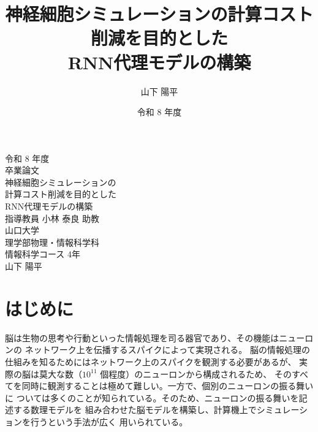 \documentclass[a4paper,11pt,openany]{ltjsreport}
\title{神経細胞シミュレーションの計算コスト削減を目的とした\\RNN代理モデルの構築}
\author{山下 陽平}
\date{令和 8 年度}
\newcommand{\TODO}[1]{\textcolor{red}{\textbf{[TODO: #1]}}}
\begin{document}
\begin{titlepage}
  \centering
  \vspace*{20mm}
  {\Large 令和 8 年度}\\[15mm]
  {\LARGE 卒業論文}\\[25mm]
  {\LARGE 神経細胞シミュレーションの}\\[3mm]
  {\LARGE 計算コスト削減を目的とした}\\[3mm]
  {\LARGE RNN代理モデルの構築}\\[32mm]
  {\large 指導教員 小林 泰良 助教}\\[20mm]
  {\large 山口大学}\\[3mm]
  {\large 理学部\quad 物理・情報科学科}\\[3mm]
  {\large 情報科学コース 4年}\\[20mm]
  {\large 山下 陽平}
  \vfill
\end{titlepage}

\tableofcontents
\clearpage

\chapter{はじめに}

脳は生物の思考や行動といった情報処理を司る器官であり、その機能はニューロンの
ネットワーク上を伝播するスパイクによって実現される\cite{yamazaki2021}。
脳の情報処理の仕組みを知るためにはネットワーク上のスパイクを観測する必要があるが、
実際の脳は莫大な数（$10^{11}$ 個程度\cite{kandel2022}）のニューロンから構成されるため、
そのすべてを同時に観測することは極めて難しい。一方で、個別のニューロンの振る舞いに
ついては多くのことが知られている。そのため、ニューロンの振る舞いを記述する数理モデルを
組み合わせた脳モデルを構築し、計算機上でシミュレーションを行うという手法が広く
用いられている。
\end{document}
